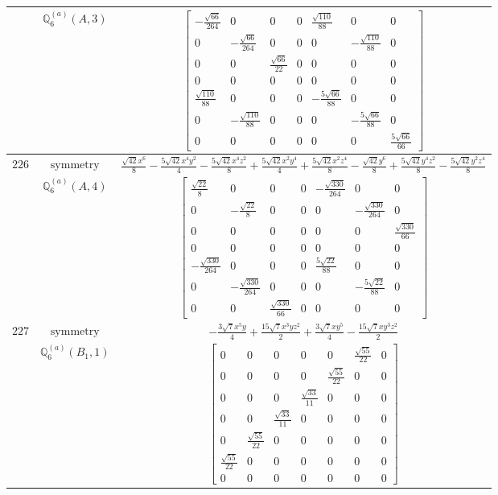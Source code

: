 \documentclass[fleqn,8pt,landscape]{jsarticle}
\begin{document}
\begin{longtable}{ccc}
$  $ & $ \mathbb{Q}_{6}^{(a)}(A,3) $ & $ \begin{bmatrix} - \frac{\sqrt{66}}{264} & 0 & 0 & 0 & \frac{\sqrt{110}}{88} & 0 & 0 \\ 0 & - \frac{\sqrt{66}}{264} & 0 & 0 & 0 & - \frac{\sqrt{110}}{88} & 0 \\ 0 & 0 & \frac{\sqrt{66}}{22} & 0 & 0 & 0 & 0 \\ 0 & 0 & 0 & 0 & 0 & 0 & 0 \\ \frac{\sqrt{110}}{88} & 0 & 0 & 0 & - \frac{5 \sqrt{66}}{88} & 0 & 0 \\ 0 & - \frac{\sqrt{110}}{88} & 0 & 0 & 0 & - \frac{5 \sqrt{66}}{88} & 0 \\ 0 & 0 & 0 & 0 & 0 & 0 & \frac{5 \sqrt{66}}{66} \end{bmatrix} $ \\ \hline
$ 226 $ & $ \text{symmetry} $ & $ \frac{\sqrt{42} x^{6}}{8} - \frac{5 \sqrt{42} x^{4} y^{2}}{4} - \frac{5 \sqrt{42} x^{4} z^{2}}{8} + \frac{5 \sqrt{42} x^{2} y^{4}}{4} + \frac{5 \sqrt{42} x^{2} z^{4}}{8} - \frac{\sqrt{42} y^{6}}{8} + \frac{5 \sqrt{42} y^{4} z^{2}}{8} - \frac{5 \sqrt{42} y^{2} z^{4}}{8} $ \\
$  $ & $ \mathbb{Q}_{6}^{(a)}(A,4) $ & $ \begin{bmatrix} \frac{\sqrt{22}}{8} & 0 & 0 & 0 & - \frac{\sqrt{330}}{264} & 0 & 0 \\ 0 & - \frac{\sqrt{22}}{8} & 0 & 0 & 0 & - \frac{\sqrt{330}}{264} & 0 \\ 0 & 0 & 0 & 0 & 0 & 0 & \frac{\sqrt{330}}{66} \\ 0 & 0 & 0 & 0 & 0 & 0 & 0 \\ - \frac{\sqrt{330}}{264} & 0 & 0 & 0 & \frac{5 \sqrt{22}}{88} & 0 & 0 \\ 0 & - \frac{\sqrt{330}}{264} & 0 & 0 & 0 & - \frac{5 \sqrt{22}}{88} & 0 \\ 0 & 0 & \frac{\sqrt{330}}{66} & 0 & 0 & 0 & 0 \end{bmatrix} $ \\ \hline
$ 227 $ & $ \text{symmetry} $ & $ - \frac{3 \sqrt{7} x^{5} y}{4} + \frac{15 \sqrt{7} x^{3} y z^{2}}{2} + \frac{3 \sqrt{7} x y^{5}}{4} - \frac{15 \sqrt{7} x y^{3} z^{2}}{2} $ \\
$  $ & $ \mathbb{Q}_{6}^{(a)}(B_{1},1) $ & $ \begin{bmatrix} 0 & 0 & 0 & 0 & 0 & \frac{\sqrt{55}}{22} & 0 \\ 0 & 0 & 0 & 0 & \frac{\sqrt{55}}{22} & 0 & 0 \\ 0 & 0 & 0 & \frac{\sqrt{33}}{11} & 0 & 0 & 0 \\ 0 & 0 & \frac{\sqrt{33}}{11} & 0 & 0 & 0 & 0 \\ 0 & \frac{\sqrt{55}}{22} & 0 & 0 & 0 & 0 & 0 \\ \frac{\sqrt{55}}{22} & 0 & 0 & 0 & 0 & 0 & 0 \\ 0 & 0 & 0 & 0 & 0 & 0 & 0 \end{bmatrix} $ \\ \hline

\end{longtable}
\end{document}
